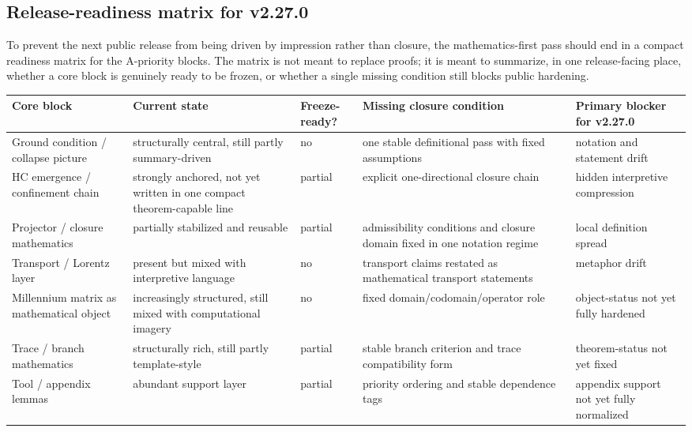 \subsection*{Release-readiness matrix for v2.27.0}
To prevent the next public release from being driven by impression rather than closure, the mathematics-first pass should end in a compact readiness matrix for the A-priority blocks. The matrix is not meant to replace proofs; it is meant to summarize, in one release-facing place, whether a core block is genuinely ready to be frozen, or whether a single missing condition still blocks public hardening.

\begin{center}
{\tiny\setlength{\tabcolsep}{2.5pt}\begin{tabular}{@{}p{} p{} p{} p{} p{}@{}}
\toprule
\textbf{Core block} & \textbf{Current state} & \textbf{Freeze-ready?} & \textbf{Missing closure condition} & \textbf{Primary blocker for v2.27.0}\\
\midrule
Ground condition / collapse picture & structurally central, still partly summary-driven & no & one stable definitional pass with fixed assumptions & notation and statement drift\\
HC emergence / confinement chain & strongly anchored, not yet written in one compact theorem-capable line & partial & explicit one-directional closure chain & hidden interpretive compression\\
Projector / closure mathematics & partially stabilized and reusable & partial & admissibility conditions and closure domain fixed in one notation regime & local definition spread\\
Transport / Lorentz layer & present but mixed with interpretive language & no & transport claims restated as mathematical transport statements & metaphor drift\\
Millennium matrix as mathematical object & increasingly structured, still mixed with computational imagery & no & fixed domain/codomain/operator role & object-status not yet fully hardened\\
Trace / branch mathematics & structurally rich, still partly template-style & partial & stable branch criterion and trace compatibility form & theorem-status not yet fixed\\
Tool / appendix lemmas & abundant support layer & partial & priority ordering and stable dependence tags & appendix support not yet fully normalized\\
\bottomrule
\end{tabular}}
\end{center}

